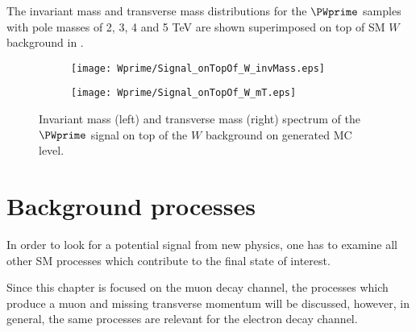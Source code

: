 The invariant mass and transverse mass distributions for the $\PWprime$ samples with pole masses of 2, 3, 4 and 5 TeV are shown superimposed on top of SM $W$ background in .

\begin{figure}
\begin{subfigure}{.5\textwidth}
  \centering
  \texttt{[image: Wprime/Signal\_onTopOf\_W\_invMass.eps]}
\end{subfigure}%
\begin{subfigure}{.5\textwidth}
  \centering
  \texttt{[image: Wprime/Signal\_onTopOf\_W\_mT.eps]}
\end{subfigure}
\caption{Invariant mass (left) and transverse mass (right) spectrum of the $\PWprime$ signal on top of the $W$ background on generated MC level.}
  \label{fig:signal_with_W}
\end{figure}



\section{Background processes}
\label{sec:wprimeBackgrounds}

In order to look for a potential signal from  new physics, one has to examine all other SM processes which contribute to the final state of interest.


Since this chapter is focused on the muon decay channel, the processes which produce a muon and missing transverse momentum will be discussed, 
however, in general, the same processes are relevant for the electron decay channel.

